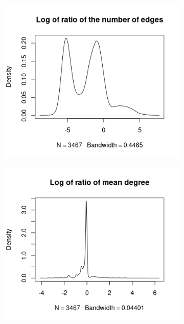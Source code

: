 \documentclass{l4proj}
\theoremstyle{definition}
\theoremstyle{remark}
\begin{document}
\begin{appendices}
  \begin{figure}
    \centering
    \begin{subfigure}[t]{0.49\textwidth}
      \centering
      \includegraphics[width=\textwidth]{images/sip_ratio_edges.png}
    \end{subfigure}
    \begin{subfigure}[t]{0.49\textwidth}
      \centering
      \includegraphics[width=\textwidth]{images/sip_ratio_meandeg.png}

\end{subfigure}
\end{figure}
\end{appendices}
\end{document}
